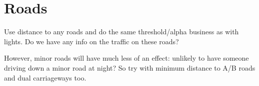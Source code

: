


\section{Roads}

Use distance to any roads and do the same threshold/alpha business as with
lights. Do we have any info on the traffic on these roads?

However, minor roads will have much less of an effect: unlikely to have someone
driving down a minor road at night? So try with minimum distance to A/B roads
and dual carriageways too.
